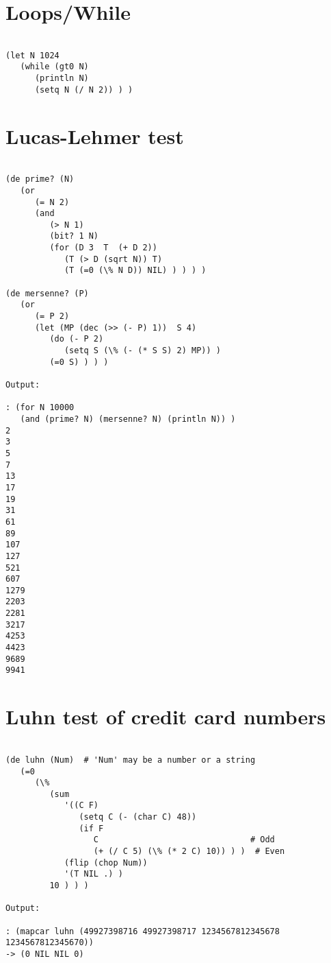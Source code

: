 \section*{Loops/While}

\begin{verbatim}

(let N 1024
   (while (gt0 N)
      (println N)
      (setq N (/ N 2)) ) )

\end{verbatim}

\section*{Lucas-Lehmer test}

\begin{verbatim}

(de prime? (N)
   (or
      (= N 2)
      (and
         (> N 1)
         (bit? 1 N)
         (for (D 3  T  (+ D 2))
            (T (> D (sqrt N)) T)
            (T (=0 (\% N D)) NIL) ) ) ) )

(de mersenne? (P)
   (or
      (= P 2)
      (let (MP (dec (>> (- P) 1))  S 4)
         (do (- P 2)
            (setq S (\% (- (* S S) 2) MP)) )
         (=0 S) ) ) )

Output:

: (for N 10000
   (and (prime? N) (mersenne? N) (println N)) )
2
3
5
7
13
17
19
31
61
89
107
127
521
607
1279
2203
2281
3217
4253
4423
9689
9941

\end{verbatim}

\section*{Luhn test of credit card numbers}

\begin{verbatim}

(de luhn (Num)  # 'Num' may be a number or a string
   (=0
      (\%
         (sum
            '((C F)
               (setq C (- (char C) 48))
               (if F
                  C                               # Odd
                  (+ (/ C 5) (\% (* 2 C) 10)) ) )  # Even
            (flip (chop Num))
            '(T NIL .) )
         10 ) ) )

Output:

: (mapcar luhn (49927398716 49927398717 1234567812345678 1234567812345670))
-> (0 NIL NIL 0)

\end{verbatim}

